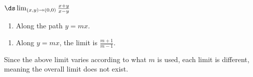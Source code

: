 {$\ds \lim_{(x,y)\to(0,0)} \frac{x+y}{x-y}$
\begin{enumerate}
	\item Along the path $y=mx$.
\end{enumerate}}
{\begin{enumerate}
	\item Along $y=mx$, the limit is $\frac{m+1}{m-1}$.
\end{enumerate}
Since the above limit varies according to what $m$ is used, each limit is different, meaning the overall limit does not exist.
}
